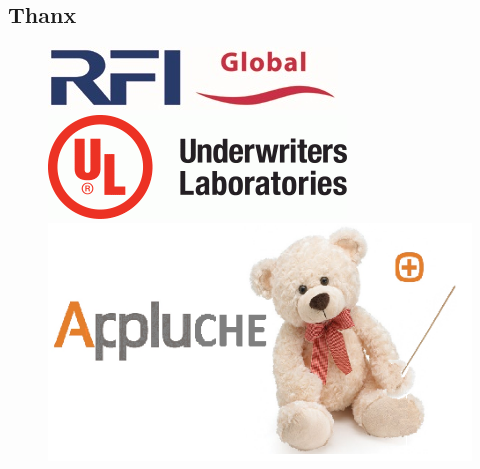 \subsection*{Thanx}
			\begin{figure}[h]
			\begin{center}
				\includegraphics[scale=0.66]{images/logorfi.jpg}\\			\vspace{3mm}
	       		\includegraphics[scale=4]{images/logoul.png}\\				\vspace{3mm}
	       		\includegraphics[scale=0.66]{images/logoapplus.png}\\ 		\vspace{3mm}

\end{center}
\end{figure}
